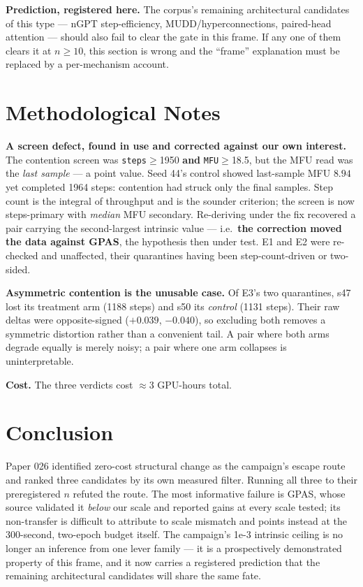 \documentclass{article}
\begin{document}
\textbf{Prediction, registered here.} The corpus's remaining architectural candidates of this type --- nGPT step-efficiency, MUDD/hyperconnections, paired-head attention --- should also fail to clear the gate in this frame. If any one of them clears it at $n\ge10$, this section is wrong and the ``frame'' explanation must be replaced by a per-mechanism account.

\section{Methodological Notes}
\textbf{A screen defect, found in use and corrected against our own interest.} The contention screen was \texttt{steps}$\ge$1950 \textbf{and} \texttt{MFU}$\ge$18.5, but the MFU read was the \emph{last sample} --- a point value. Seed 44's control showed last-sample MFU $8.94$ yet completed 1964 steps: contention had struck only the final samples. Step count is the integral of throughput and is the sounder criterion; the screen is now steps-primary with \emph{median} MFU secondary. Re-deriving under the fix recovered a pair carrying the second-largest intrinsic value --- i.e.\ \textbf{the correction moved the data against GPAS}, the hypothesis then under test. E1 and E2 were re-checked and unaffected, their quarantines having been step-count-driven or two-sided.

\textbf{Asymmetric contention is the unusable case.} Of E3's two quarantines, s47 lost its treatment arm (1188 steps) and s50 its \emph{control} (1131 steps). Their raw deltas were opposite-signed ($+0.039$, $-0.040$), so excluding both removes a symmetric distortion rather than a convenient tail. A pair where both arms degrade equally is merely noisy; a pair where one arm collapses is uninterpretable.

\textbf{Cost.} The three verdicts cost $\approx$3 GPU-hours total.

\section{Conclusion}
Paper 026 identified zero-cost structural change as the campaign's escape route and ranked three candidates by its own measured filter. Running all three to their preregistered $n$ refuted the route. The most informative failure is GPAS, whose source validated it \emph{below} our scale and reported gains at every scale tested; its non-transfer is difficult to attribute to scale mismatch and points instead at the 300-second, two-epoch budget itself. The campaign's 1e-3 intrinsic ceiling is no longer an inference from one lever family --- it is a prospectively demonstrated property of this frame, and it now carries a registered prediction that the remaining architectural candidates will share the same fate.
\end{document}
